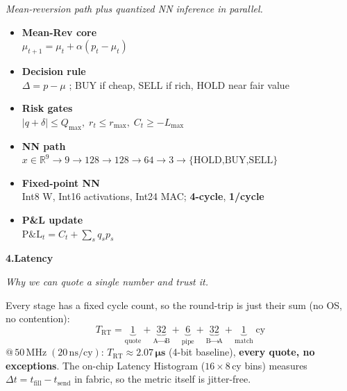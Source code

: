 \documentclass[final]{article}
\begin{document}
\begin{minipage}[t]{34.8in}
{{\begin{minipage}[t]{8.0in}
\vspace{0.04in}
{\fontsize{20}{26}\selectfont\itshape\color{uwgray}%
 Mean-reversion path plus quantized NN inference in parallel.}

\vspace{0.06in}
\begin{itemize}[leftmargin=0.24in, itemsep=0.04in, labelsep=0.08in, topsep=0.03in]
  \item[\color{boardBcolor}\textbullet]
    \textbf{Mean-Rev core}\\
    \(\mu_{t+1}=\mu_t+\alpha(p_t-\mu_t)\)
  \item[\color{boardBcolor}\textbullet]
    \textbf{Decision rule}\\
    \(\Delta=p-\mu\) ; BUY if cheap, SELL if rich, HOLD near fair value
  \item[\color{boardBcolor}\textbullet]
    \textbf{Risk gates}\\
    \(|q+\delta|\le Q_{\max},\; r_t\le r_{\max},\; C_t\ge -L_{\max}\)
  \item[\color{boardBcolor}\textbullet]
    \textbf{NN path}\\
    \(x\in\mathbb{R}^9\to 9\!\to\!128\!\to\!128\!\to\!64\!\to\!3\to\{\text{HOLD,BUY,SELL}\}\)
  \item[\color{boardBcolor}\textbullet]
    \textbf{Fixed-point NN}\\
    Int8 W, Int16 activations, Int24 MAC; \textbf{4-cycle}, \textbf{1/cycle}
  \item[\color{boardBcolor}\textbullet]
    \textbf{P\&L update}\\
    \(\mathrm{P\&L}_t = C_t + \sum_s q_s p_s\)
\end{itemize}
\end{minipage}\hfill
\begin{minipage}[t]{8.0in}
{\fontsize{24}{30}\selectfont\bfseries\color{linkcolor}%
 4.\;Latency}

\vspace{0.04in}
{\fontsize{20}{26}\selectfont\itshape\color{uwgray}%
 Why we can quote a single number and trust it.}

\vspace{0.06in}
Every stage has a fixed cycle count, so the round-trip is just
their sum (no OS, no contention):
\[
  T_{\mathrm{RT}} =
  \underbrace{1}_{\text{quote}} +
  \underbrace{32}_{\text{A}\to\text{B}} +
  \underbrace{6}_{\text{pipe}} +
  \underbrace{32}_{\text{B}\to\text{A}} +
  \underbrace{1}_{\text{match}}\;\text{cy}
\]
\(@\,50\,\mathrm{MHz}\;(20\,\mathrm{ns/cy})\):\;
\(T_{\mathrm{RT}}\!\approx\!\mathbf{2.07\,\mu s}\) (4-bit baseline),
\textbf{every quote, no exceptions}. The on-chip Latency Histogram
(\(16\!\times\!8\)\,cy bins) measures
\(\Delta t = t_{\mathrm{fill}}\!-\!t_{\mathrm{send}}\) in fabric, so
the metric itself is jitter-free.
\end{minipage}
}
}


\end{minipage}
\end{document}

